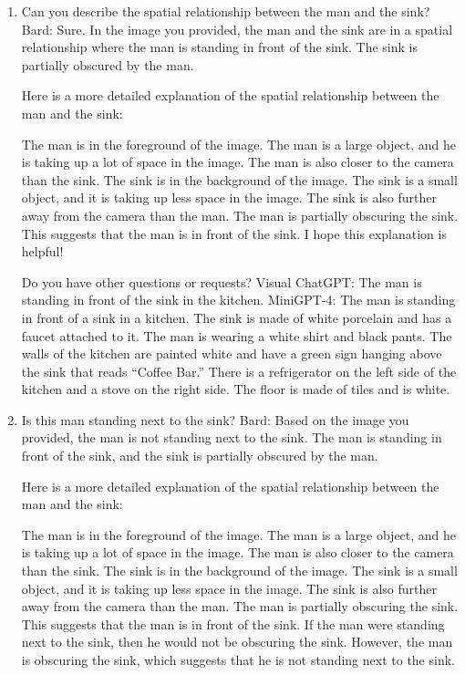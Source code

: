 \begin{enumerate}
    \item Can you describe the spatial relationship between the man and the sink?
    \subitem Bard: 
    Sure. In the image you provided, the man and the sink are in a spatial relationship where the man is standing in front of the sink. The sink is partially obscured by the man.
    
    Here is a more detailed explanation of the spatial relationship between the man and the sink:
    
    The man is in the foreground of the image. The man is a large object, and he is taking up a lot of space in the image. The man is also closer to the camera than the sink.
    The sink is in the background of the image. The sink is a small object, and it is taking up less space in the image. The sink is also further away from the camera than the man.
    The man is partially obscuring the sink. This suggests that the man is in front of the sink.
    I hope this explanation is helpful!
    
    Do you have other questions or requests?
    \subitem Visual ChatGPT: The man is standing in front of the sink in the kitchen.
    \subitem MiniGPT-4: The man is standing in front of a sink in a kitchen. The sink is made of white porcelain and has a faucet attached to it. The man is wearing a white shirt and black pants. The walls of the kitchen are painted white and have a green sign hanging above the sink that reads “Coffee Bar.” There is a refrigerator on the left side of the kitchen and a stove on the right side. The floor is made of tiles and is white.
    \item Is this man standing next to the sink?
    \subitem Bard: 
    Based on the image you provided, the man is not standing next to the sink. The man is standing in front of the sink, and the sink is partially obscured by the man.
    
    Here is a more detailed explanation of the spatial relationship between the man and the sink:
    
    The man is in the foreground of the image. The man is a large object, and he is taking up a lot of space in the image. The man is also closer to the camera than the sink.
    The sink is in the background of the image. The sink is a small object, and it is taking up less space in the image. The sink is also further away from the camera than the man.
    The man is partially obscuring the sink. This suggests that the man is in front of the sink.
    If the man were standing next to the sink, then he would not be obscuring the sink. However, the man is obscuring the sink, which suggests that he is not standing next to the sink.
    

\end{enumerate}
